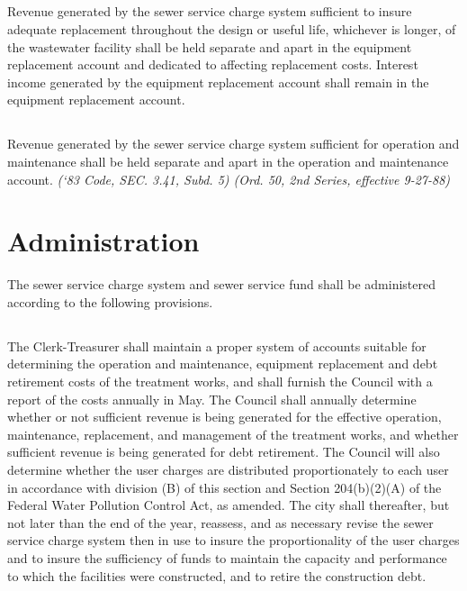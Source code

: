 \documentclass[code.tex]{subfiles}
\begin{document}
\subsection{}
Revenue generated by the sewer service charge system sufficient to insure adequate replacement throughout the design or useful life, whichever is longer, of the wastewater facility shall be held separate and apart in the equipment replacement account and dedicated to affecting replacement costs.  Interest income generated by the equipment replacement account shall remain in the equipment replacement account.
\subsection{}
Revenue generated by the sewer service charge system sufficient for operation and maintenance shall be held separate and apart in the operation and maintenance account.\newline
\emph{(‘83 Code, SEC. 3.41, Subd. 5) (Ord. 50, 2nd Series, effective 9-27-88)}
\section{Administration}
The sewer service charge system and sewer service fund shall be administered according to the following provisions.
\subsection{}
The Clerk-Treasurer shall maintain a proper system of accounts suitable for determining the operation and maintenance, equipment replacement and debt retirement costs of the treatment works, and shall furnish the Council with a report of the costs annually in May.  The Council shall annually determine whether or not sufficient revenue is being generated for the effective operation, maintenance, replacement, and management of the treatment works, and whether sufficient revenue is being generated for debt retirement. The Council will also determine whether the user charges are distributed proportionately to each user in accordance with division (B) of this section and Section 204(b)(2)(A) of the Federal Water Pollution Control Act, as amended. The city shall thereafter, but not later than the end of the year, reassess, and as necessary revise the sewer service charge system then in use to insure the proportionality of the user charges and to insure the sufficiency of funds to maintain the capacity and performance to which the facilities were constructed, and to retire the construction debt.
\end{document}
